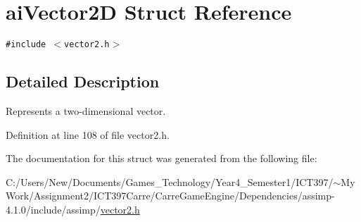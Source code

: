 \hypertarget{structai_vector2_d}{
\section{aiVector2D Struct Reference}
\label{structai_vector2_d}
}
{\tt \#include $<$vector2.h$>$}



\subsection{Detailed Description}
Represents a two-dimensional vector. 

Definition at line 108 of file vector2.h.

The documentation for this struct was generated from the following file:\begin{CompactItemize}
\item 
C:/Users/New/Documents/Games\_\-Technology/Year4\_\-Semester1/ICT397/$\sim$My Work/Assignment2/ICT397Carre/CarreGameEngine/Dependencies/assimp-4.1.0/include/assimp/\hyperlink{vector2_8h}{vector2.h}\end{CompactItemize}
